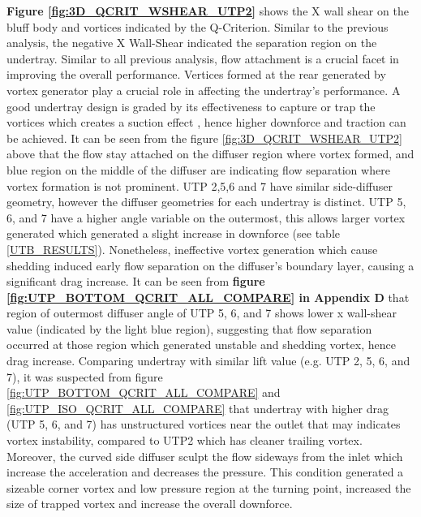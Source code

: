 \noindent \textbf{Figure \ref{fig:3D_QCRIT_WSHEAR_UTP2}}  shows the X wall shear on the bluff body and vortices indicated by the Q-Criterion. Similar to the previous analysis, the negative X Wall-Shear indicated the separation region on the undertray. Similar to all previous analysis, flow attachment is a crucial facet in improving the overall performance. Vertices formed at the rear generated by vortex generator play a crucial role in affecting the undertray's performance. A good undertray design is graded by its  effectiveness to capture or trap the vortices which creates a suction effect \cite{Bouferrouk2014OnVehicles}, hence higher downforce and traction can be achieved. It can be seen from the figure \ref{fig:3D_QCRIT_WSHEAR_UTP2} above that the flow stay attached on the diffuser region where vortex formed, and blue region on the middle of the diffuser are indicating flow separation where vortex formation is not prominent. UTP 2,5,6 and 7 have similar side-diffuser geometry, however the diffuser geometries for each undertray is distinct. UTP 5, 6, and 7 have a higher angle variable on the outermost, this allows larger vortex generated which generated a slight increase in downforce (see table \ref{UTB_RESULTS}). Nonetheless, ineffective vortex generation which cause shedding induced early flow separation on the diffuser's boundary layer, causing a significant drag increase. It can be seen from \textbf{figure \ref{fig:UTP_BOTTOM_QCRIT_ALL_COMPARE} in Appendix D} that region of outermost diffuser angle of UTP 5, 6, and 7 shows lower x wall-shear value (indicated by the light blue region), suggesting that flow separation occurred at those region which generated unstable and shedding vortex, hence drag increase. Comparing undertray with similar lift value (e.g. UTP 2, 5, 6, and 7), it was suspected from figure \ref{fig:UTP_BOTTOM_QCRIT_ALL_COMPARE} and \ref{fig:UTP_ISO_QCRIT_ALL_COMPARE} that undertray with higher drag (UTP 5, 6, and 7) has unstructured vortices near the outlet that may indicates vortex instability, compared to UTP2 which has cleaner trailing vortex. Moreover, the curved side diffuser sculpt the flow sideways from the inlet which increase the acceleration and decreases the pressure. This condition generated a sizeable corner vortex and low pressure region at the turning point, increased the size of trapped vortex and increase the overall downforce.



